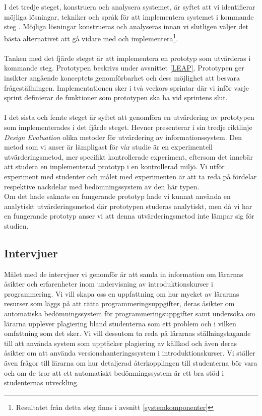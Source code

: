 \documentclass[a4paper,11pt]{article}
\begin{document}
{\\
\\
I det tredje steget, konstruera och analysera systemet, är syftet att vi identifierar möjliga lösningar, tekniker och språk för att implementera systemet i kommande steg \cite{nunamaker}. Möjliga lösningar konstrueras och analyseras innan vi slutligen väljer det bästa alternativet att gå vidare med och implementera\footnote{Resultatet från detta steg finns i avsnitt \ref{systemkomponenter}}.
\\
\\
Tanken med det fjärde steget är att implementera en prototyp som utvärderas i kommande steg. Prototypen beskrivs under avsnittet \ref{LEAP}. Prototypen ger insikter angående konceptets genomförbarhet och dess möjlighet att besvara frågeställningen. Implementationen sker i två veckors sprintar där vi inför varje sprint definierar de funktioner som prototypen ska ha vid sprintens slut.
\\
\\
I det sista och femte steget är syftet att genomföra en utvärdering av prototypen som implementerades i det fjärde steget. Hevner \cite{hevner} presenterar i sin tredje riktlinje \textit{Design Evaluation} olika metoder för utvärdering av informationssystem. Den metod som vi anser är lämpligast för vår studie är en experimentell utvärderingsmetod, mer specifikt kontrollerade experiment, eftersom det innebär att studera en implementerad prototyp i en kontrollerad miljö. Vi utför experiment med studenter och målet med experimenten är att ta reda på fördelar respektive nackdelar med bedömningssystem av den här typen. 
\\
Om det hade saknats en fungerande prototyp hade vi kunnat använda en analytiskt utvärderingsmetod där prototypen studeras analytiskt, men då vi har en fungerande prototyp anser vi att denna utvärderingsmetod inte lämpar sig för studien.

\subsection{Intervjuer}\label{Intervjuer}

Målet med de intervjuer vi genomför är att samla in information om lärarnas åsikter och erfarenheter inom undervisning av introduktionskurser i programmering. Vi vill skapa oss en uppfattning om hur mycket av lärarnas resurser som läggs på att rätta programmeringsuppgifter, deras åsikter om automatiska bedömningssystem för programmeringsuppgifter samt undersöka om lärarna upplever plagiering bland studenterna som ett problem och i vilken omfattning som det sker. Vi vill dessutom ta reda på lärarnas ställningstagande till att använda system som upptäcker plagiering av källkod och även deras åsikter om att använda versionshanteringssystem i introduktionskurser. Vi ställer även frågor till lärarna om hur detaljerad återkopplingen till studenterna bör vara och om de tror att ett automatiskt bedömningssystem är ett bra stöd i studenternas utveckling.

}
\end{document}
